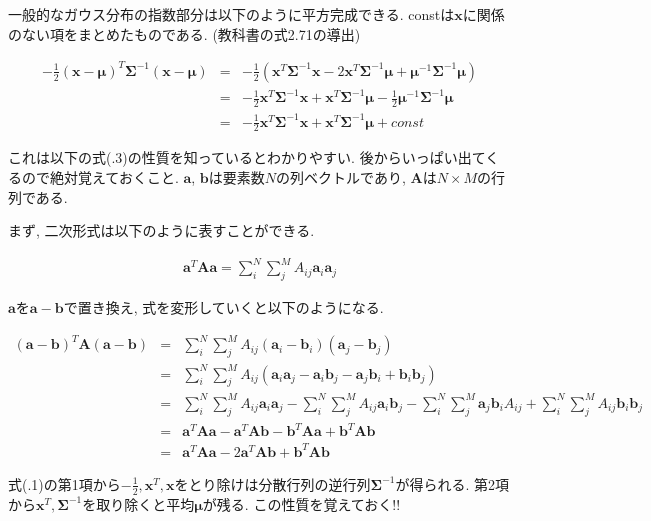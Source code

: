 一般的なガウス分布の指数部分は以下のように平方完成できる. constは$\bm{x}$に関係のない項をまとめたものである. (教科書の式2.71の導出)

\begin{eqnarray}
    -\frac{1}{2}(\bm{x} - \bm{\mu})^{T}\bm{\Sigma}^{-1}(\bm{x} - \bm{\mu}) &=& -\frac{1}{2}(\bm{x}^{T}\bm{\Sigma}^{-1}\bm{x} - 2\bm{x}^{T}\bm{\Sigma}^{-1}\bm{\mu} + \bm{\mu}^{-1}\bm{\Sigma}^{-1}\bm{\mu}) \nonumber \\
    &=& -\frac{1}{2}\bm{x}^{T}\bm{\Sigma}^{-1}\bm{x} + \bm{x}^{T}\bm{\Sigma}^{-1}\bm{\mu} - \frac{1}{2}\bm{\mu}^{-1}\bm{\Sigma}^{-1}\bm{\mu} \nonumber \\
    &=& -\frac{1}{2}\bm{x}^{T}\bm{\Sigma}^{-1}\bm{x} + \bm{x}^{T}\bm{\Sigma}^{-1}\bm{\mu} + const
\end{eqnarray}

これは以下の式(.3)の性質を知っているとわかりやすい. 後からいっぱい出てくるので絶対覚えておくこと. $\bm{a}$, $\bm{b}$は要素数$N$の列ベクトルであり, $\bm{A}$は$N \times M$の行列である.

まず, 二次形式は以下のように表すことができる.

\begin{eqnarray}
    \bm{a}^T\bm{A}\bm{a} = \sum^{N}_{i}\sum^{M}_j A_{ij} \bm{a}_i \bm{a}_j
\end{eqnarray}

\newpage

$\bm{a}$を$\bm{a} - \bm{b}$で置き換え, 式を変形していくと以下のようになる.

\begin{eqnarray}
    (\bm{a} - \bm{b})^T\bm{A}(\bm{a} - \bm{b}) &=& \sum^{N}_i\sum^{M}_j A_{ij}(\bm{a}_i - \bm{b}_i)(\bm{a}_j - \bm{b}_j) \nonumber \\
    &=& \sum^{N}_i\sum^{M}_j A_{ij} (\bm{a}_i \bm{a}_j - \bm{a}_i \bm{b}_j - \bm{a}_j \bm{b}_i + \bm{b}_i \bm{b}_j) \nonumber \\
    &=& \sum^{N}_i\sum^{M}_j A_{ij}\bm{a}_i\bm{a}_j - \sum^{N}_i\sum^{M}_j A_{ij}\bm{a}_i\bm{b}_j - \sum^{N}_i\sum^{M}_j\bm{a}_j\bm{b}_i A_{ij} + \sum^{N}_i\sum^{M}_j A_{ij} \bm{b}_i\bm{b}_j \nonumber \\
    &=& \bm{a}^T\bm{A}\bm{a} - \bm{a}^T\bm{A}\bm{b} - \bm{b}^T\bm{A}\bm{a} + \bm{b}^T\bm{A}\bm{b} \nonumber \\
    &=& \bm{a}^T\bm{A}\bm{a} - 2\bm{a}^T\bm{A}\bm{b} + \bm{b}^T\bm{A}\bm{b}
\end{eqnarray}

式(.1)の第1項から$-\frac{1}{2}, \bm{x}^T, \bm{x}$をとり除けは分散行列の逆行列$\bm{\Sigma}^{-1}$が得られる. 第2項から$\bm{x}^T, \bm{\Sigma}^{-1}$を取り除くと平均$\bm{\mu}$が残る. この性質を覚えておく!!

